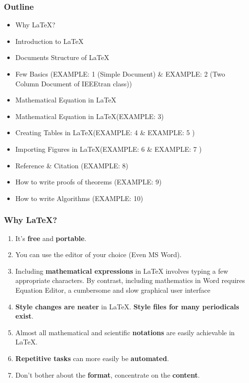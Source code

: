 \documentclass[xcolor=x11names,compress]{beamer}
\theoremstyle{definition}
\theoremstyle{remark}
\theoremstyle{plain}
\renewcommand{\(}{\begin{columns}}
\renewcommand{\)}{\end{columns}}
\newcommand{\<}[1]{\begin{column}{#1}}
\renewcommand{\>}{\end{column}}
\begin{document}

\begin{frame}
\frametitle{{\color{DeepSkyBlue4}Outline}} 
\small{
\begin{itemize}


%
\item Why \LaTeX?
\item Introduction to \LaTeX
\item Documents Structure of \LaTeX
\item Few Basics (EXAMPLE: 1 (Simple Document) \& EXAMPLE: 2 (Two Column Document of IEEEtran class))
\item Mathematical Equation in \LaTeX
\item Mathematical Equation in \LaTeX (EXAMPLE: 3)
\item Creating Tables in \LaTeX (EXAMPLE: 4 \& EXAMPLE: 5 )
\item Importing Figures in \LaTeX (EXAMPLE: 6 \& EXAMPLE: 7 )
\item Reference \& Citation (EXAMPLE: 8)
\item How to write proofs of theorems (EXAMPLE: 9)
\item How to write Algorithms (EXAMPLE: 10)

\end{itemize}
}
\end{frame}


\begin{frame}
\frametitle{{\color{DeepSkyBlue4}Why \LaTeX?}} 
\begin{enumerate}
\item 	It's \textbf{free} and \textbf{portable}.
\item  You can use the editor of your choice (Even MS Word). 
\item Including \textbf{mathematical expressions} in LaTeX involves typing a few appropriate characters. By contrast, including mathematics in Word requires Equation Editor, a cumbersome and slow graphical user interface 
\item  \textbf{Style changes are neater} in \LaTeX. \textbf{Style files for many periodicals exist}.  
\item Almost all mathematical and scientific \textbf{notations} are easily achievable in LaTeX.
\item \textbf{Repetitive tasks} can more easily be \textbf{automated}. 
\item Don't bother about the \textbf{format}, concentrate on the \textbf{content}. 
\end{enumerate}
\end{frame}
\end{document}
